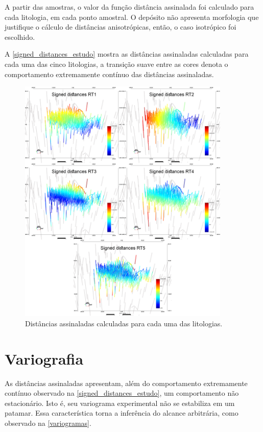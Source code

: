 A partir das amostras, o valor da função distância assinalada foi calculado para cada litologia, em cada ponto amostral. O depósito não apresenta morfologia que justifique o cálculo de distâncias anisotrópicas, então, o caso isotrópico foi escolhido.

A \autoref{signed_distances_estudo} mostra as distâncias assinaladas calculadas para cada uma das cinco litologias, a transição suave entre as cores denota o comportamento extremamente contínuo das distâncias assinaladas.

\begin{figure}[H]
	\caption{\label{signed_distances_estudo}Distâncias assinaladas calculadas para cada uma das litologias.}
	\begin{center}
		\includegraphics[width=0.9\textwidth]{estudo_de_caso/signed_distances}
	\end{center}
\end{figure}

\section{Variografia}

As distâncias assinaladas apresentam, além do comportamento extremamente contínuo observado na \autoref{signed_distances_estudo}, um comportamento não estacionário. Isto é, seu variograma experimental não se estabiliza em um patamar. Essa característica torna a inferência do alcance arbitrária, como observado na \autoref{variogramas}. 

